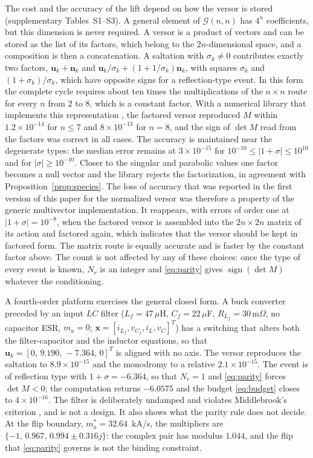 \documentclass[journal]{IEEEtran}
\newcommand{\Gnn}{\mathcal{G}(n,n)}
\newcommand{\sgn}{\operatorname{sign}}
\begin{document}
The cost and the accuracy of the lift depend on how the versor is stored
(supplementary Tables~S1--S3). A general element of $\Gnn$ has $4^{n}$
coefficients, but this dimension is never required. A versor is a product
of vectors and can be stored as the list of its factors, which belong to the
$2n$-dimensional space, and a composition is then a concatenation. A
saltation with $\sigma_k\neq0$ contributes exactly two factors,
$\bm{u}_k+\bm{n}_k$ and $\bm{u}_k/\sigma_k+(1+1/\sigma_k)\bm{n}_k$, with
squares $\sigma_k$ and $(1+\sigma_k)/\sigma_k$, which have opposite signs for
a reflection-type event. In this form the complete cycle requires about ten
times the multiplications of the $n\times n$ route for every $n$ from $2$ to
$8$, which is a constant factor. With a numerical library that implements
this representation \cite{eid2025gafl}, the factored versor reproduced $M$
within $1.2\times10^{-14}$ for $n\le7$ and $8\times10^{-13}$ for $n=8$, and
the sign of $\det M$ read from the factors was correct in all cases. The
accuracy is maintained near the degenerate types: the median error remains
at $3\times10^{-15}$ for $10^{-10}\le\lvert1+\sigma\rvert\le10^{10}$ and for
$\lvert\sigma\rvert\ge10^{-10}$. Closer to the singular and parabolic values
one factor becomes a null vector and the library rejects the factorization,
in agreement with Proposition~\ref{prop:species}. The loss of accuracy that
was reported in the first version of this paper for the normalized versor
was therefore a property of the generic multivector implementation. It
reappears, with errors of order one at $\lvert1+\sigma\rvert=10^{-8}$, when
the factored versor is assembled into the $2n\times2n$ matrix of its action
and factored again, which indicates that the versor should be kept in
factored form. The matrix route is equally accurate and is faster by the
constant factor above. The count is not affected by any of these choices:
once the type of every event is known, $N_r$ is an integer and
\eqref{eq:parity} gives $\sgn(\det M)$ whatever the conditioning.

A fourth-order platform exercises the general closed form. A buck converter
preceded by an input $LC$ filter ($L_f=47\,\mu$H, $C_f=22\,\mu$F,
$R_{L_f}=30\,\mathrm{m}\Omega$, no capacitor ESR, $m_a=0$;
$\bm{x}=[i_{L_f},v_{C_f},i_L,v_C]^{T}$) has a switching that alters both the
filter-capacitor and the inductor equations, so that
$\bm{u}_k=[0,\,9.190,\,-7.364,\,0]^{T}$ is aligned with no axis. The versor
reproduces the saltation to $8.9\times10^{-15}$ and the monodromy to a
relative $2.1\times10^{-15}$. The event is of reflection type with
$1+\sigma=-6.364$, so that $N_r=1$ and \eqref{eq:parity} forces $\det M<0$;
the computation returns $-6.0575$ and the budget \eqref{eq:budget} closes to
$4\times10^{-16}$. The filter is deliberately undamped and violates
Middlebrook's criterion \cite{middlebrook1976}, and is not a design. It also shows what the parity rule does not
decide. At the flip boundary, $m_a^{*}=32.64$~kA/s, the
multipliers are $\{-1,\,0.967,\,0.994\pm0.316j\}$: the complex pair has
modulus $1.044$, and the flip that \eqref{eq:parity} governs is not the
binding constraint.
\end{document}
